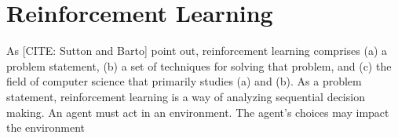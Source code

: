 \section{Reinforcement Learning}

As [CITE: Sutton and Barto] point out, reinforcement learning comprises (a) a problem statement, (b) a set of techniques for solving that problem, and (c) the field of computer science that primarily studies (a) and (b).
As a problem statement, reinforcement learning is a way of analyzing sequential decision making.
An agent must act in an environment.
The agent's choices may impact the environment 

